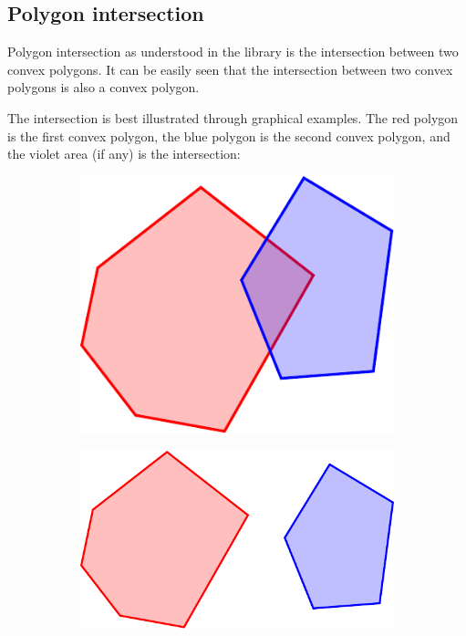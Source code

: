 
\subsection{Polygon intersection}


Polygon intersection as understood in the library
is the intersection between two convex polygons.
It can be easily seen that the intersection between
two convex polygons is also a convex polygon.

The intersection is best illustrated through graphical examples.
The red polygon is the first convex polygon, the blue polygon
is the second convex polygon, and the violet area (if any) is the intersection:

\begin{figure}[p]
	\centering
	\begin{subfigure}[b]{0.3\linewidth}
	  \centering
	  \includegraphics[scale=0.5]{intersections/intersection_simple.pdf}
	  \label{fig:intersection_simple}
	\end{subfigure}
	\begin{subfigure}[b]{0.4\linewidth}
	  \centering
	  \includegraphics[scale=0.5]{intersections/intersection_none.pdf}

\end{subfigure}
\end{figure}
